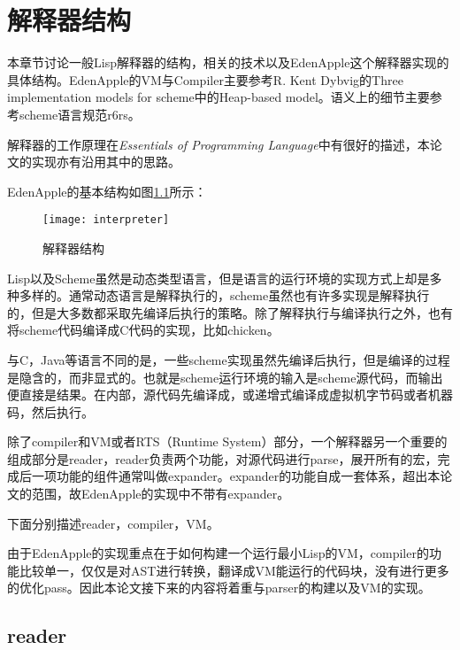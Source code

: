 %
%

{
    \let\centering\raggedright
    \chapter{解释器结构}
    \label{ch:interp structure}
}    \thispagestyle{hubu@thesis}


本章节讨论一般Lisp解释器的结构，相关的技术以及EdenApple这个解释器实现的具体结构。EdenApple的VM与Compiler主要参考R. Kent Dybvig的Three implementation models for scheme\cite{dybvig87timpl}中的Heap-based model。语义上的细节主要参考scheme语言规范r6rs\cite{r6rs}。

解释器的工作原理在\textit{Essentials of Programming Language\cite{friedman2001eopl}}中有很好的描述，本论文的实现亦有沿用其中的思路。

EdenApple的基本结构如图\ref{fig:interp structure}所示：

\begin{figure}[h]
\begin{center}
\texttt{[image: interpreter]}
\end{center}
\caption{解释器结构}
\label{fig:interp structure}
\end{figure}

Lisp以及Scheme虽然是动态类型语言，但是语言的运行环境的实现方式上却是多种多样的。通常动态语言是解释执行的，scheme虽然也有许多实现是解释执行的，但是大多数都采取先编译后执行的策略。除了解释执行与编译执行之外，也有将scheme代码编译成C代码的实现，比如chicken。

与C，Java等语言不同的是，一些scheme实现虽然先编译后执行，但是编译的过程是隐含的，而非显式的。也就是scheme运行环境的输入是scheme源代码，而输出便直接是结果。在内部，源代码先编译成，或递增式编译成虚拟机字节码或者机器码，然后执行。

除了compiler和VM或者RTS（Runtime System）部分，一个解释器另一个重要的组成部分是reader，reader负责两个功能，对源代码进行parse，展开所有的宏，完成后一项功能的组件通常叫做expander。expander的功能自成一套体系，超出本论文的范围，故EdenApple的实现中不带有expander。

下面分别描述reader，compiler，VM。

由于EdenApple的实现重点在于如何构建一个运行最小Lisp的VM，compiler的功能比较单一，仅仅是对AST进行转换，翻译成VM能运行的代码块，没有进行更多的优化pass。因此本论文接下来的内容将着重与parser的构建以及VM的实现。

\section{reader}

